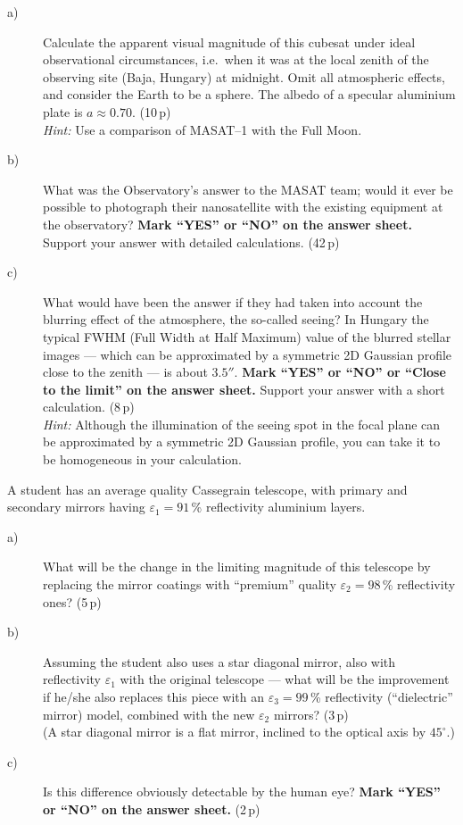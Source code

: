 \begin{description}
\item[a)] Calculate the apparent visual magnitude of this cubesat under ideal
  observational circumstances, i.e.\ when it was at the local zenith of the
  observing site (Baja, Hungary) at midnight. Omit all atmospheric effects, and
  consider the Earth to be a sphere. The albedo of a specular aluminium plate
  is $a \approx 0.70$. \hfill(10\,p)\\
  \textit{Hint:} Use a comparison of MASAT--1 with the Full Moon.
\item[b)] What was the Observatory's answer to the MASAT team; would it ever be
  possible to photograph their nanosatellite with the existing equipment at the
  observatory? \textbf{Mark ``YES'' or ``NO'' on the answer sheet.} Support
  your answer with detailed calculations. \hfill(42\,p)
\item[c)] What would have been the answer if they had taken into account the
  blurring effect of the atmosphere, the so-called seeing? In Hungary the
  typical FWHM (Full Width at Half Maximum) value of the blurred stellar images
  --- which can be approximated by a symmetric 2D Gaussian profile close to the
  zenith --- is about $3.5''$. \textbf{Mark ``YES'' or ``NO'' or ``Close to the
  limit'' on the answer sheet.} Support your answer with a short calculation.
  \hfill(8\,p)\\
  \textit{Hint:} Although the illumination of the seeing spot in the focal
  plane can be approximated by a symmetric 2D Gaussian profile, you can take it
  to be homogeneous in your calculation.
\end{description}

A student has an average quality Cassegrain telescope, with primary and
secondary mirrors having $\varepsilon_1 = 91$\,\% reflectivity aluminium
layers.

\begin{description}
\item[a)] What will be the change in the limiting magnitude of this telescope
  by replacing the mirror coatings with ``premium'' quality
  $\varepsilon_2 = 98$\,\% reflectivity ones? \hfill(5\,p)
\item[b)] Assuming the student also uses a star diagonal mirror, also with
  reflectivity $\varepsilon_1$ with the original telescope --- what will be the
  improvement if he/she also replaces this piece with an
  $\varepsilon_3 = 99$\,\% reflectivity (``dielectric'' mirror) model, combined
  with the new $\varepsilon_2$ mirrors? \hfill(3\,p)\\
  (A star diagonal mirror is a flat mirror, inclined to the optical axis by
  $45^\circ$.)
\item[c)] Is this difference obviously detectable by the human eye? \textbf{
  Mark ``YES'' or ``NO'' on the answer sheet.} \hfill(2\,p)
\end{description}

